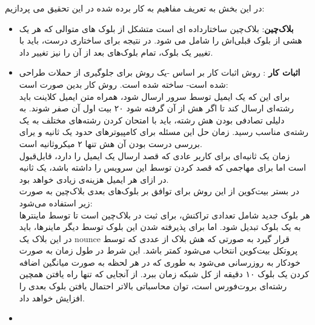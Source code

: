 \par
در این بخش به تعریف مفاهیم به کار برده شده در این تحقیق می پردازیم: 
\begin{itemize}
	\item 
	\textbf{بلاک‌چین}:
	بلاک‌چین ساختارداده ای است متشکل از بلوک های متوالی که هر یک هشی از بلوک قبلی‌اش را شامل می شود. در نتیجه برای ساختاری درست، باید با تغییر یک بلوک، تمام بلوک‌‌های بعد از آن را نیز تغییر داد. 
	\item
	\textbf{اثبات کار} :
	روش اثبات کار بر اساس
	\cite{hashcash}
	 -‌یک روش برای جلوگیری از حملات
	   طراحی شده است- ساخته شده است. روش کار 
	   بدین صورت است:
	   \\
	   برای این که یک ایمیل توسط سرور ارسال شود، همراه متن ایمیل کلاینت باید رشته‌ای ارسال کند تا اگر  هش 
	   از آن گرفته شود ۲۰ بیت اول آن صفر شوند. به دلیلی تصادفی بودن هش رشته، باید با امتحان کردن رشته‌‌های مختلف به یک رشته‌ی مناسب رسید. زمان حل این مسئله‌ برای کامپیوتر‌های 
	   حدود یک ثانیه و یرای بررسی درست بودن آن هش تنها ۲ میکروثانیه است.
	   \\
	   زمان یک‌ ثانیه‌ای برای کاربر عادی که قصد ارسال یک ایمیل را دارد، قابل‌قبول است اما برای مهاجمی که قصد 
	   کردن توسط این سرویس را داشته باشد، یک ثانیه در ازای هر ایمیل هزینه‌ی زیادی خواهد بود.
	   \\
	   در بستر بیت‌کوین از این روش برای توافق بر بلوک‌های بعدی بلاک‌چین به صورت زیر استفاده می‌شود:
	   \\
	هر بلوک جدید شامل تعدادی تراکنش، برای ثبت در بلاک‌چین است تا توسط ماینترها به یک بلوک تبدیل شود. اما برای پذیرفته شدن این بلوک توسط دیگر ماینرها، باید در این بلاک یک nounce قرار گیرد به صورتی که هش بلاک از عددی که توسط پروتکل بیت‌کوین انتخاب می‌شود کمتر باشد. این شرط در طول زمان به صورت خودکار به روزرسانی می‌شود به طوری که در هر لحظه به صورت میانگین اضافه کردن یک بلوک ۱۰ دقیقه از کل شبکه زمان ببرد. از آنجایی که تنها راه یافتن همچین رشته‌ای بروت‌فورس
	 است، توان محاسباتی بالاتر احتمال یافتن بلوک بعدی را افزایش خواهد داد. 
	 \\
	
	
	\item 
	

\end{itemize}
